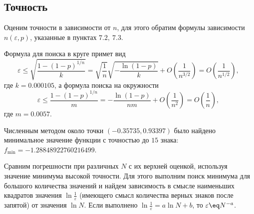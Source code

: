 \documentclass[12pt, a4paper]{article}
\begin{document}
\subsection{Точность}
Оценим точности в зависимости от $n$, для этого обратим формулы зависимости $n(\varepsilon,p)$, указанные в пунктах $7.2,\ 7.3$. 

Формула для поиска в круге примет вид
\[ \varepsilon \leqslant \sqrt{\frac{1-(1-p)^{1/n}}{k}} = \sqrt{\frac{1}{n}}\sqrt{-\frac{\ln(1-p)}{k}} + O\left(\frac{1}{n^{3/2}}\right) = O\left(\frac{1}{n^{1/2}}\right), \]
где $k = 0.000105$, а формула поиска на окружности
\[\varepsilon \leqslant \frac{1-(1-p)^{1/n}}{m} = -\frac{\ln(1-p)}{nm}+O\left( \frac 1{n^2} \right) = O \left( \frac 1n \right),\]
где $m=0.0057$.

Численным методом около точки $(-0.35735, 0.93397)$ было найдено минимальное значение функции с точностью до $15$ знака: $f_{\min} =-1.28848922760216499$. 

Сравним погрешности при различных $N$ с их верхней оценкой, используя значение минимума высокой точности. Для этого выполним поиск минимума для большого количества значений и найдем зависимость в смысле наименьших квадратов значения $\ln{\frac 1\varepsilon}$ (имеющего смысл количества верных знаков после запятой) от значения $\ln N$. Если выполнено $\ln{\frac 1\varepsilon} = a\ln N + b$, то $\varepsilon \eq N^{-a}$.
\end{document}
